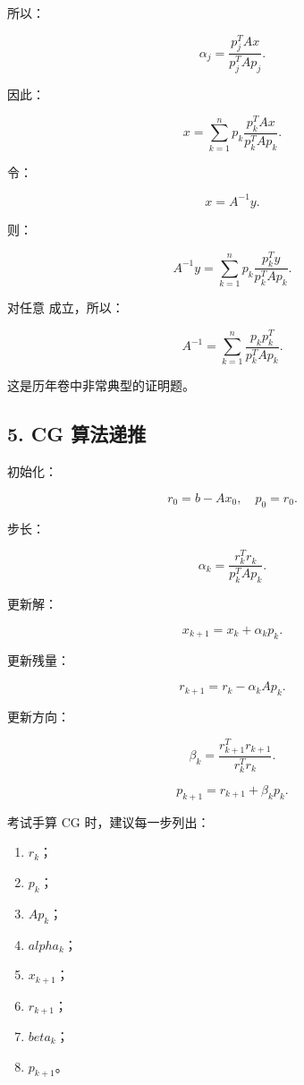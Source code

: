 \documentclass[11pt,a4paper]{ctexart}
\newcommand{\code}[1]{\begingroup\ttfamily\small #1\endgroup}
\begin{document}
所以：

\[
\alpha_j=\frac{p_j^TAx}{p_j^TAp_j}.
\]

因此：

\[
x=\sum_{k=1}^n p_k\frac{p_k^TAx}{p_k^TAp_k}.
\]

令：

\[
x=A^{-1}y.
\]

则：

\[
A^{-1}y=\sum_{k=1}^n p_k\frac{p_k^Ty}{p_k^TAp_k}.
\]

对任意 \code{} 成立，所以：

\[
A^{-1}=\sum_{k=1}^n\frac{p_kp_k^T}{p_k^TAp_k}.
\]

这是历年卷中非常典型的证明题。


\subsection*{5. CG 算法递推}


初始化：

\[
r_0=b-Ax_0,\quad p_0=r_0.
\]

步长：

\[
\alpha_k=\frac{r_k^Tr_k}{p_k^TAp_k}.
\]

更新解：

\[
x_{k+1}=x_k+\alpha_k p_k.
\]

更新残量：

\[
r_{k+1}=r_k-\alpha_k Ap_k.
\]

更新方向：

\[
\beta_k=\frac{r_{k+1}^Tr_{k+1}}{r_k^Tr_k}.
\]

\[
p_{k+1}=r_{k+1}+\beta_k p_k.
\]

考试手算 CG 时，建议每一步列出：

\begin{enumerate}

\item $r_k$；

\item $p_k$；

\item $Ap_k$；

\item $alpha_k$；

\item $x_{k+1}$；

\item $r_{k+1}$；

\item $beta_k$；

\item $p_{k+1}$。

\end{enumerate}
\end{document}
